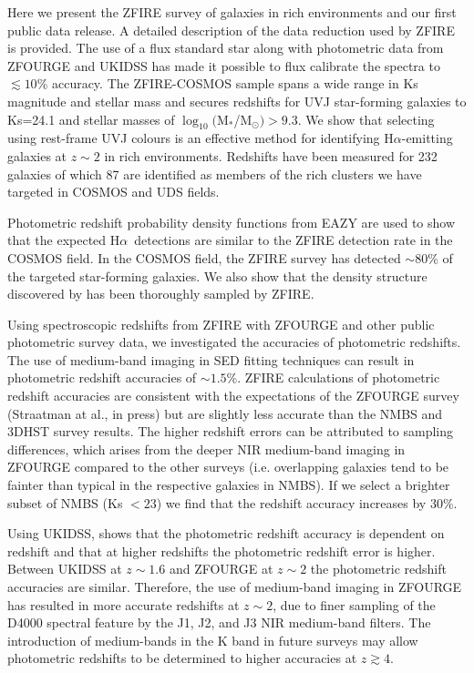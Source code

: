 \documentclass[iop]{emulateapj}
\newcommand{\Halpha}{H$\alpha$}
\newcommand{\around}{$\sim$}
\newcommand{\mass}{M$_*$/M$_\odot$}
\begin{document}
Here we present the ZFIRE survey of galaxies in rich environments and our first public data release.  A detailed description of the data reduction used by ZFIRE is provided.  The use of a flux standard star along with photometric data from ZFOURGE and UKIDSS has made it possible to flux calibrate the spectra to $\lesssim10$\% accuracy.  The ZFIRE-COSMOS sample spans a wide range in Ks magnitude and stellar mass and secures redshifts for UVJ star-forming galaxies to Ks=24.1 and stellar masses of $\log_{10}($\mass$)>9.3$.  We show that selecting using rest-frame UVJ colours is an effective method for identifying \Halpha-emitting galaxies at $z\sim2$ in rich environments. Redshifts have been measured for 232 galaxies of which 87 are identified as members of the rich clusters we have targeted in COSMOS and UDS fields. 


Photometric redshift probability density functions from EAZY are used to show that the expected \Halpha\ detections are similar to the ZFIRE detection rate in the COSMOS field. In the COSMOS field, the ZFIRE survey has detected \around80\% of the targeted star-forming galaxies. We also show that the density structure discovered by \citet{Spitler2012} has been thoroughly sampled by ZFIRE. 



Using spectroscopic redshifts from ZFIRE with ZFOURGE and other public photometric survey data, we investigated the accuracies of photometric redshifts. The use of medium-band imaging in SED fitting techniques can result in photometric redshift accuracies of $\sim1.5\%$. ZFIRE calculations of photometric redshift accuracies are consistent with the expectations of the ZFOURGE survey (Straatman at al., in press) but are slightly less accurate  than the NMBS \citep{Whitaker2011} and 3DHST \citep{Skelton2014} survey results. The higher redshift errors can be attributed to sampling differences, which arises from the deeper NIR medium-band imaging in ZFOURGE compared to the other surveys (i.e. overlapping galaxies tend to be fainter than typical in the respective galaxies in NMBS). 
If we select a brighter subset of NMBS (Ks $<23$) we find that the redshift accuracy increases by 30\%.

Using UKIDSS, \citet{Quadri2012} shows that the photometric redshift accuracy is dependent on redshift and that at higher redshifts the photometric redshift error is higher. Between UKIDSS at $z\sim1.6$  and ZFOURGE at $z\sim2$ the photometric redshift accuracies are similar. Therefore, the use of medium-band imaging in ZFOURGE has resulted in more accurate redshifts at $z\sim2$, due to finer sampling of the D4000 spectral feature by the J1, J2, and J3 NIR medium-band filters. The introduction of medium-bands in the K band in future surveys may allow photometric redshifts to be determined to higher accuracies at $z\gtrsim4$. 
\end{document}
